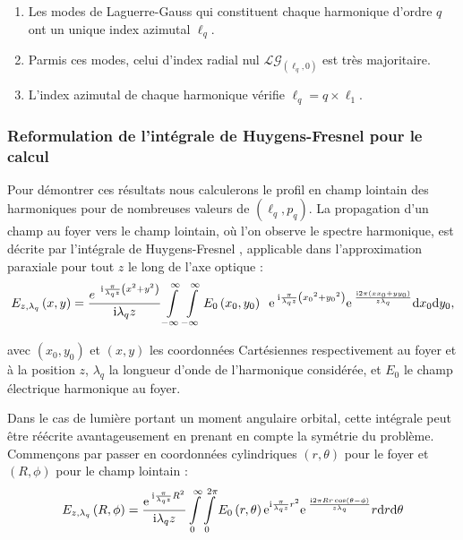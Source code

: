 \begin{enumerate}
\item Les modes de Laguerre-Gauss qui constituent chaque harmonique d'ordre $q$ ont un unique index azimutal $\ell_q$.
\item Parmis ces modes, celui d'index radial nul $\mathcal{LG}_{(\ell_q,0)}$ est très majoritaire.
\item L'index azimutal de chaque harmonique vérifie $\ell_q=q\times\ell_1$.
\label{enum:properties}
\end{enumerate}

\subsubsection{Reformulation de l'intégrale de Huygens-Fresnel pour le calcul}
Pour démontrer ces résultats nous calculerons le profil en champ lointain des harmoniques pour de nombreuses valeurs de $(\ell_q,p_q)$. La propagation d'un champ au foyer vers le champ lointain, où l'on observe le spectre harmonique, est décrite par l'intégrale de Huygens-Fresnel , applicable dans l'approximation paraxiale pour tout $z$ le long de l'axe optique :
	\begin{equation*}
	{E_{z,{\lambda _q}}}\left( {x,y} \right) = \frac{{{e^{\;\;\mathrm{i}\frac{{\pi }}{{{\lambda _q}z}}\left( {{x^2} + {y^2}} \right)}}}}{{\mathrm{i}{\lambda _q}z}}\int \limits_{ - \infty }^\infty \int \limits_{ - \infty }^\infty  {E_0}\left( {{x_0},{y_0}} \right)\;\;{{\mathrm{e}}^{\;\mathrm{i}\frac{\pi }{{{\lambda _q}z}}\left( {{x_0}^2 + {y_0}^2} \right)}}{{\mathrm{e}}^{\;\frac{{ \mathrm{i} 2{\pi}\left( {x{x_0} + y{y_0}} \right)}}{{z{\lambda _q}}}}}{\mathrm{d}}{x_0}{\mathrm{d}}{y_0},
	\end{equation*}

avec $\left( {{x_0},{y_0}} \right)$ et $\left( {x,y} \right)$ les coordonnées Cartésiennes respectivement au foyer et à la position $z$, ${\lambda _q}$ la longueur d'onde de l'harmonique considérée, et ${E_0}$ le champ électrique harmonique au foyer.

Dans le cas de lumière portant un moment angulaire orbital, cette intégrale peut être réécrite avantageusement en prenant en compte la symétrie du problème. Commençons par passer en coordonnées cylindriques $\left( {r,\theta } \right)$ pour le foyer et $\left( {R,\phi } \right)$ pour le champ lointain :
\begin{equation*}
{E_{z,{\lambda _q}}}\left( {R,\phi } \right) = \frac{{{\mathrm{e}^{\;\mathrm{i}\frac{{\pi}}{{{\lambda _q}z}}{R^2}}}}}{{\mathrm{i}{\lambda _q}z}}\int \limits_0^\infty \int \limits_0^{2{\pi}} {E_0}\left( {r,\theta } \right){\mathrm{e}^{\mathrm{i}\frac{{\pi}}{{{\lambda _q}z}}{r^2}}}{\mathrm{e}^{\;\frac{{ \mathrm{i} 2{\pi}Rr\cos \left( {\theta  - \phi } \right)}}{{z{\lambda _q}}}}}r{\mathrm{d}}r{\mathrm{d}}\theta 
\end{equation*}

